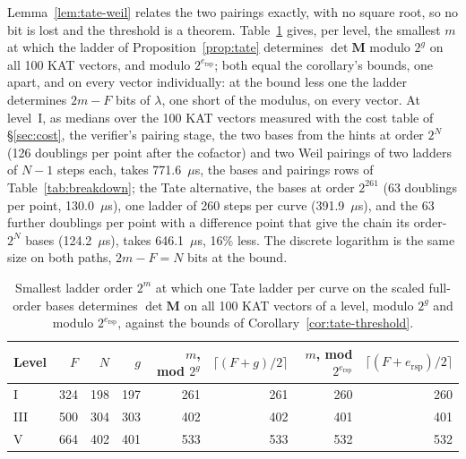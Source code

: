 \documentclass[version=preprint,notanonymous]{iacrcc}
\newcommand{\ers}{e_{\mathrm{rsp}}}
\newcommand{\Mm}{\mathbf{M}}
\begin{document}
Lemma~\ref{lem:tate-weil} relates the two pairings exactly, with no square
root, so no bit is lost and the threshold is a theorem.
Table~\ref{tab:threshold} gives, per level, the smallest $m$ at which the
ladder of Proposition~\ref{prop:tate} determines $\det \Mm$ modulo $2^g$
on all 100 KAT vectors, and modulo $2^{\ers}$; both equal the
corollary's bounds, one apart, and on every vector individually: at the
bound less one the ladder determines $2m - F$ bits of $\lambda$, one short
of the modulus, on every vector. At level~I, as medians over the
100 KAT vectors measured with the cost table of \S\ref{sec:cost}, the
verifier's pairing stage, the two bases from the hints at order $2^N$
(126 doublings per point after the cofactor) and two Weil pairings of two
ladders of $N - 1$ steps each, takes 771.6~$\mu$s, the bases and
pairings rows of Table~\ref{tab:breakdown}; the Tate alternative, the
bases at order $2^{261}$ (63 doublings per point, 130.0~$\mu$s), one
ladder of 260 steps per curve (391.9~$\mu$s), and the 63 further
doublings per point with a difference point that give the chain its
order-$2^N$ bases (124.2~$\mu$s), takes 646.1~$\mu$s, 16\% less.
The discrete logarithm is the same size on both paths, $2m - F = N$ bits
at the bound.

\begin{table}[H]
\centering
\caption{Smallest ladder order $2^m$ at which one Tate ladder per curve on
the scaled full-order bases determines $\det \Mm$ on all 100 KAT vectors
of a level, modulo $2^g$ and modulo $2^{\ers}$, against the bounds of
Corollary~\ref{cor:tate-threshold}.}
\label{tab:threshold}
\footnotesize
\setlength{\tabcolsep}{4pt}
\begin{tabular}{l r r r r r r r}
\toprule
\textbf{Level} & $F$ & $N$ & $g$ & $m$, mod $2^g$ & $\lceil (F + g)/2 \rceil$ & $m$, mod $2^{\ers}$ & $\lceil (F + \ers)/2 \rceil$ \\
\midrule
I   & 324 & 198 & 197 & 261 & 261 & 260 & 260 \\
III & 500 & 304 & 303 & 402 & 402 & 401 & 401 \\
V   & 664 & 402 & 401 & 533 & 533 & 532 & 532 \\
\bottomrule
\end{tabular}
\end{table}
\end{document}
